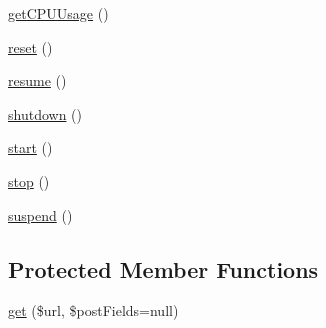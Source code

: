 \begin{DoxyCompactItemize}
\item 
\hyperlink{class_proxmox_node_v_m_a2f951beefbf86eef6ae29615ced2d61f}{get\+C\+P\+U\+Usage} ()
\item 
\hyperlink{class_proxmox_node_v_m_a4a20559544fdf4dcb457e258dc976cf8}{reset} ()
\item 
\hyperlink{class_proxmox_node_v_m_a041e41d280b044e403234e27bd864e71}{resume} ()
\item 
\hyperlink{class_proxmox_node_v_m_a482087c71391537bfe6fece68a58d420}{shutdown} ()
\item 
\hyperlink{class_proxmox_node_v_m_af8fa59992209e36dccb3eefb0f75531f}{start} ()
\item 
\hyperlink{class_proxmox_node_v_m_a8b6fc76a620d7557d06e9a11a9ffb509}{stop} ()
\item 
\hyperlink{class_proxmox_node_v_m_ad73006a505121228f3b075c2409787d2}{suspend} ()
\end{DoxyCompactItemize}
\subsection*{Protected Member Functions}
\begin{DoxyCompactItemize}
\item 
\hyperlink{class_proxmox_node_v_m_a06921d906d966f332513c748b93b86d0}{get} (\$url, \$post\+Fields=null)
\end{DoxyCompactItemize}
